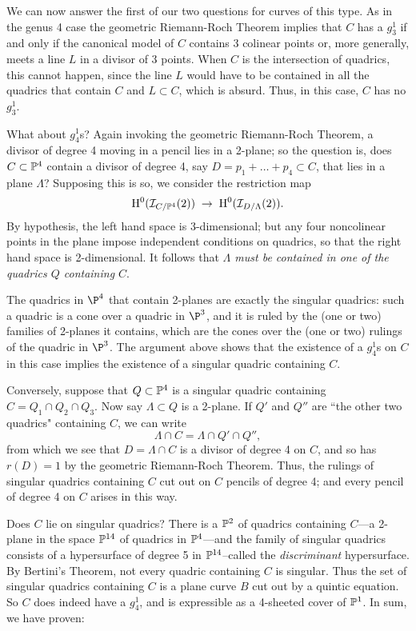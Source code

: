 We can now answer the first of our two questions for curves of this type. As in the genus 4 case the geometric Riemann-Roch Theorem implies that $C$ has a $g^1_3$ if and only if the canonical model of $C$ contains 3 colinear points or, more generally, meets a line $L$ in a divisor of 3 points. When $C$ is the intersection of quadrics, this cannot happen, since the line $L$ would have to be contained in all the quadrics that contain $C$ and $L\subset C$, which is absurd. Thus, in this case, 
$C$ has no $g^1_3$.

What about $g^1_4$s? Again invoking the geometric Riemann-Roch Theorem, a divisor of degree 4 moving in a pencil lies in a 2-plane; so the question is, does $C \subset \PP^4$ contain a divisor of degree 4, say $D = p_1+\dots +p_4 \subset C$, that lies in a plane $\Lambda$? Supposing this is so, we consider the restriction map
$$
\HH^0(\cI_{C/\PP^4}(2)) \; \to \; \HH^0(\cI_{D/\Lambda}(2)).
$$
By hypothesis, the left hand space is 3-dimensional; but any four noncolinear points in the plane  impose independent conditions on quadrics,  so that the right hand space is 2-dimensional. It follows that \emph{$\Lambda$ must be contained in one of the quadrics $Q$ containing $C$}. 

The quadrics in $\P^4$ that contain 2-planes are exactly the singular quadrics: such a quadric is a cone over a quadric in $\P^3$, and it is ruled by the (one or two) families of 2-planes it contains, which are the cones over the (one or two) rulings of the quadric in $\P^3$. The argument above shows that the existence of a $g_4^1$s on $C$ in this case implies the existence of a singular quadric containing $C$.

Conversely, suppose that $Q \subset \PP^4$ is a singular quadric containing $C = Q_1 \cap Q_2 \cap Q_3$. Now say $\Lambda \subset Q$ is  a 2-plane. If $Q'$ and $Q''$ are ``the other two quadrics" containing $C$, we can write
$$
\Lambda \cap C = \Lambda \cap Q' \cap Q'', 
$$ 
from which we see that $D = \Lambda \cap C$ is a divisor of degree 4 on $C$, and so has $r(D) = 1$ by the geometric Riemann-Roch Theorem. Thus, the rulings of  singular quadrics containing $C$ cut out on $C$ pencils of degree 4; and every pencil of degree 4 on $C$ arises in this way.

Does $C$ lie on singular quadrics? There is a $\PP^2$ of quadrics containing $C$---a 2-plane in the space $\PP^{14}$ of quadrics in $\PP^4$---and the family of singular quadrics  consists of a  hypersurface of degree 5 in $\PP^{14}$--called the \emph{discriminant} hypersurface. By Bertini's Theorem, not every quadric containing $C$ is singular. Thus the set of singular quadrics containing $C$ is a plane curve $B$ cut out by a quintic equation. So $C$ does indeed have a $g^1_4$, and is expressible as a 4-sheeted cover of $\PP^1$. In sum, we have proven:

